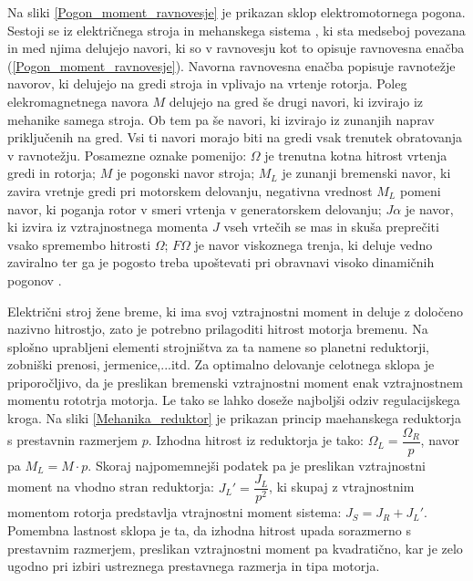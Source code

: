 \documentclass[a4paper,twoside,openright,12pt]{book}
\begin{document}
Na sliki \ref{Pogon_moment_ravnovesje} je prikazan sklop elektromotornega pogona. Sestoji se iz električnega stroja in mehanskega sistema , ki sta medseboj povezana in med njima delujejo navori, ki so  v ravnovesju kot to opisuje ravnovesna enačba (\ref{Pogon_moment_ravnovesje}). Navorna ravnovesna enačba popisuje ravnotežje navorov, ki delujejo na gredi stroja in vplivajo na vrtenje rotorja. Poleg elekromagnetnega navora $M$ delujejo na gred še drugi navori, ki izvirajo iz mehanike samega stroja. Ob tem pa še navori, ki izvirajo iz zunanjih naprav priključenih na gred. Vsi ti navori morajo biti na gredi vsak trenutek obratovanja v ravnotežju. Posamezne oznake pomenijo: $\Omega$ je trenutna kotna hitrost vrtenja gredi in rotorja; $M$ je pogonski navor stroja; $M_L$ je zunanji bremenski navor, ki zavira vretnje gredi pri motorskem delovanju, negativna vrednost $M_L$ pomeni navor, ki poganja rotor v smeri vrtenja v generatorskem delovanju; $J\alpha$ je navor, ki izvira iz vztrajnostnega momenta $J$ vseh vrtečih se mas in skuša preprečiti vsako spremembo hitrosti $\Omega$; $F\Omega$ je navor viskoznega trenja, ki deluje vedno zaviralno ter ga je pogosto treba upoštevati pri obravnavi visoko dinamičnih pogonov \cite{miljavec2009vezna}.

Električni stroj žene breme, ki ima svoj vztrajnostni moment in deluje z določeno nazivno hitrostjo, zato je potrebno prilagoditi hitrost motorja bremenu. Na splošno uprabljeni elementi strojništva za ta namene so planetni reduktorji, zobniški prenosi, jermenice,...itd. Za optimalno delovanje celotnega sklopa je priporočljivo, da je preslikan bremenski vztrajnostni moment enak vztrajnostnem momentu rototrja motorja. Le tako se lahko doseže najboljši odziv regulacijskega kroga. Na sliki \ref{Mehanika_reduktor} je prikazan princip maehanskega reduktorja s prestavnin razmerjem $p$. Izhodna hitrost iz reduktorja je tako: $\Omega_L = \dfrac{\Omega_R}{p}$, navor pa $M_L=M\cdot p$. Skoraj najpomemnejši podatek pa je preslikan vztrajnostni moment na vhodno stran reduktorja: $J_L'=\dfrac{J_L}{p^2}$, ki skupaj z vtrajnostnim momentom rotorja predstavlja vtrajnostni moment sistema: $J_S=J_R+J_L'$. Pomembna lastnost sklopa je ta, da izhodna hitrost upada sorazmerno s prestavnim razmerjem, preslikan vztrajnostni moment pa kvadratično, kar je zelo ugodno pri izbiri ustreznega prestavnega razmerja in tipa motorja.\\
\end{document}
